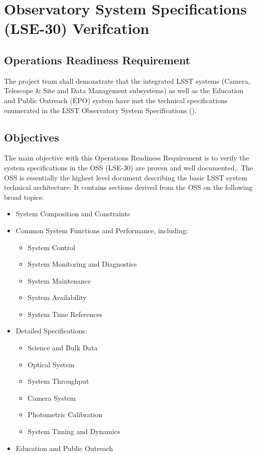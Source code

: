 \section{Observatory System Specifications (LSE-30) Verifcation}  \label{sec:oss}

\subsection{Operations Readiness Requirement}
The project team shall demonstrate that the integrated LSST systems (Camera, Telescope \& Site and Data Management subsystems) as well as the Education and Public Outreach (EPO) system have met the technical specifications enumerated in the LSST Observatory System Specifications ().

\subsection{Objectives}

The main objective with this Operations Readiness Requirement is to verify the system specifications in the OSS (LSE-30) are proven and well documented..  The OSS is essentially the highest level document describing the basic LSST system technical architecture.  It contains sections derived from the OSS on the following broad topics:

\begin{itemize}
\item System Composition and Constraints

\item Common System Functions and Performance, including:

	\begin{itemize}
		\item System Control
		\item System Monitoring and Diagnostics
		\item System Maintenance
		\item System Availability
		\item System Time References
	\end{itemize}

\item Detailed Specifications:

	\begin{itemize}
		\item Science and Bulk Data
		\item Optical System
		\item System Throughput
		\item Camera System
		\item Photometric Calibration
		\item System Timing and Dynamics
	\end{itemize}
	
\item Education and Public Outreach

\end{itemize}

